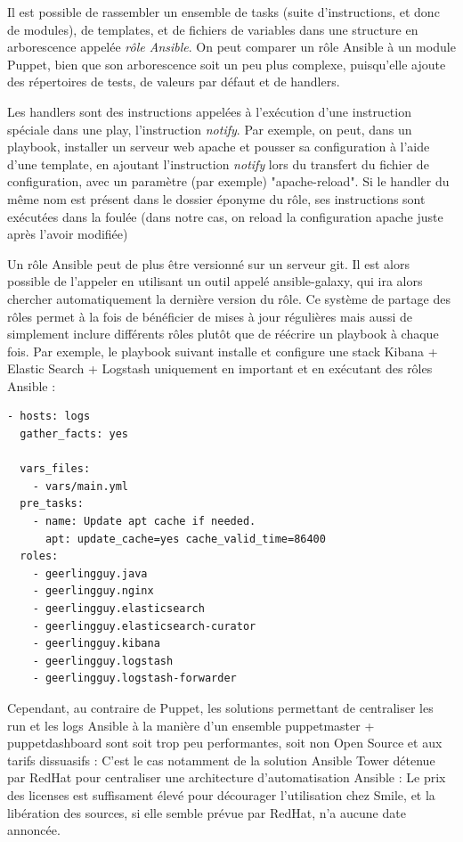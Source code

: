 \documentclass[14 pt]{extreport}
\begin{document}
Il est possible de rassembler un ensemble de tasks (suite d'instructions, et donc de modules), de templates, et de fichiers de variables dans une structure en arborescence appelée \emph{rôle Ansible}. On peut comparer un rôle Ansible à un module Puppet, bien que son arborescence soit un peu plus complexe, puisqu'elle ajoute des répertoires de tests, de valeurs par défaut et de handlers.

Les handlers sont des instructions appelées à l'exécution d'une instruction spéciale dans une play, l'instruction \emph{notify}. Par exemple, on peut, dans un playbook, installer un serveur web apache et pousser sa configuration à l'aide d'une template, en ajoutant l'instruction \emph{notify} lors du transfert du fichier de configuration, avec un paramètre (par exemple) "apache-reload". Si le handler du même nom est présent dans le dossier éponyme du rôle, ses instructions sont exécutées dans la foulée (dans notre cas, on reload la configuration apache juste après l'avoir modifiée)

Un rôle Ansible peut de plus être versionné sur un serveur git. Il est alors possible de l'appeler en utilisant un outil appelé ansible-galaxy, qui ira alors chercher automatiquement la dernière version du rôle. Ce système de partage des rôles permet à la fois de bénéficier de mises à jour régulières mais aussi de simplement inclure différents rôles plutôt que de réécrire un playbook à chaque fois. Par exemple, le playbook suivant installe et configure une stack Kibana + Elastic Search + Logstash uniquement en important et en exécutant des rôles Ansible :

\begin{framed}
\begin{Verbatim}[fontsize=\scriptsize]
- hosts: logs
  gather_facts: yes
  
  vars_files:
    - vars/main.yml
  pre_tasks:
    - name: Update apt cache if needed.
	  apt: update_cache=yes cache_valid_time=86400
  roles:
    - geerlingguy.java
	- geerlingguy.nginx
	- geerlingguy.elasticsearch
	- geerlingguy.elasticsearch-curator
	- geerlingguy.kibana
	- geerlingguy.logstash
	- geerlingguy.logstash-forwarder
\end{Verbatim}
\end{framed}

Cependant, au contraire de Puppet, les solutions permettant de centraliser les run et les logs Ansible à la manière d'un ensemble puppetmaster + puppetdashboard sont soit trop peu performantes, soit non Open Source et aux tarifs dissuasifs : C'est le cas notamment de la solution Ansible Tower détenue par RedHat pour centraliser une architecture d'automatisation Ansible : Le prix des licenses est suffisament élevé pour décourager l'utilisation chez Smile, et la libération des sources, si elle semble prévue par RedHat, n'a aucune date annoncée.
\end{document}
